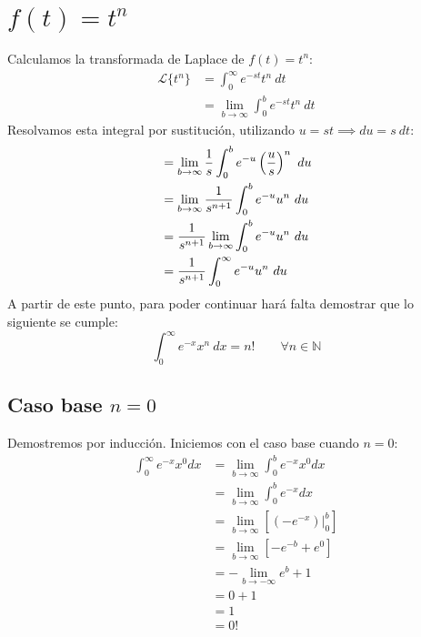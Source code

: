 \documentclass[12pt, a4paper]{article}
\begin{document}
\section{\texorpdfstring{\(f(t)=t^n \)}{f (t) = t n}}

Calculamos la transformada de Laplace de \(f(t) = t^{n}\):
\begin{align*}
    \mathcal{L}\{t^n\}&=\int_0^\infty e^{-st}t^n\ dt\\
    &=\lim_{b\to\infty}\int_0^b e^{-st}t^n\ dt
\end{align*}
Resolvamos esta integral por sustitución, utilizando \(u = st \implies du = s\ dt\):
\begin{align} \label{eq:orig-laplace}
    &=\lim_{b\to\infty} \frac{1}{s} \int_{0}^{b} e^{-u} \left( \frac{u}{s} \right)^{n}\ du \notag \\
    &=\lim_{b\to\infty} \frac{1}{s^{n+1}} \int_0^b e^{-u} u^{n}\ du \notag \\
    &= \frac{1}{s^{n+1}} \lim_{b\to\infty} \int_0^b e^{-u} u^{n}\ du \notag \\
    &= \frac{1}{s^{n+1}} \int_0^\infty e^{-u} u^{n}\ du
\end{align}
A partir de este punto, para poder continuar hará falta demostrar que lo siguiente se cumple:
\begin{equation} \label{eq:n-fact}
    \int_0^\infty e^{-x}x^n\ dx = n! \qquad \forall n \in \mathbb{N}
\end{equation}

\subsection{Caso base \texorpdfstring{\(n = 0\)}{n = 0}}

Demostremos por inducción. Iniciemos con el caso base cuando \(n = 0\):
\begin{align*}
	\int_0^\infty e^{-x}x^0dx&=\lim_{b\to\infty}\int_0^b e^{-x}x^0dx\\
	&=\lim_{b\to\infty}\int_0^b e^{-x}dx\\
	&=\lim_{b\to\infty} \left[ \left. \left( -e^{-x} \right) \right|_0^b \right] \\
	&=\lim_{b\to\infty} \left[ -e^{-b}+e^{0} \right] \\
	&= - \lim_{b\to- \infty} e^{b} + 1 \\
	&= 0+1 \\
	&= 1 \\
	&= 0!
\end{align*}
\end{document}
